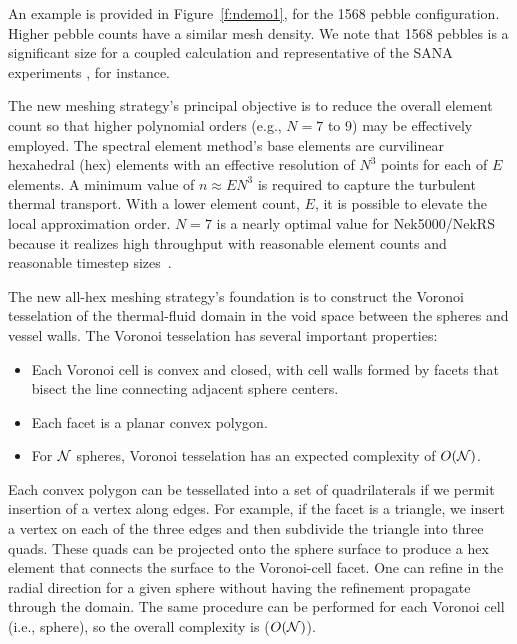 An example is provided in Figure~\ref{f:ndemo1}, for the 1568
pebble configuration. Higher pebble counts have a similar mesh density.
We note that 1568 pebbles is a significant size for a coupled calculation and
representative of the SANA experiments \cite{zou2017validation}, for instance.

The new meshing strategy's principal objective is to reduce the
overall element count so that higher polynomial orders (e.g., $N=7$
to 9) may be effectively employed.   The spectral element method's base elements are curvilinear hexahedral (hex) elements with an effective resolution of $N^3$ points for each of $E$ elements.
A minimum value of $n \approx EN^3$ is required to capture the turbulent
thermal transport.  With a lower element count, $E$, it is possible to
elevate the local approximation order.  $N=7$ is a nearly optimal value
for Nek5000/NekRS because it realizes high throughput with reasonable
element counts and reasonable timestep sizes~\cite{fischer20a}.

The new all-hex meshing strategy's foundation is to construct
the Voronoi tesselation of the thermal-fluid domain in the void space
between the spheres and vessel walls.  The Voronoi tesselation has
several important properties:
\begin{itemize}
  \item Each Voronoi cell is convex and closed, with cell walls formed by facets that bisect the line connecting adjacent sphere centers.
  \item Each facet is a planar convex polygon.
  \item For $\cal N$ spheres, Voronoi tesselation has an expected
        complexity of $O(\cal N)$.
\end{itemize}
Each convex polygon can be tessellated into a set of quadrilaterals
if we permit insertion of a vertex along edges.  For example, if the
facet is a triangle, we insert a vertex on each of the three
edges and then subdivide the triangle into three quads.  These
quads can be projected onto the sphere surface to produce a hex element
that connects the surface to the Voronoi-cell facet.  One can refine in the radial direction for a given sphere without having the
refinement propagate through the domain.  The same procedure
can be performed for each Voronoi cell (i.e., sphere), so the
overall complexity is ($O(\cal N)$).

